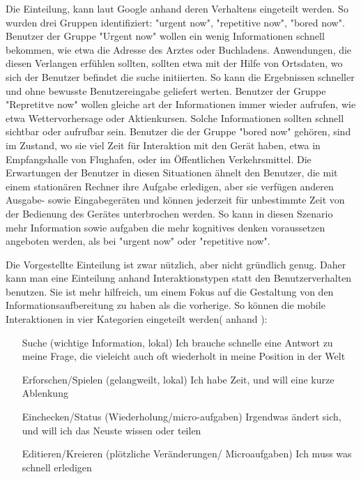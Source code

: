 Die Einteilung, kann laut Google anhand deren Verhaltens eingeteilt werden. So wurden drei Gruppen identifiziert: "urgent now", "repetitive now", "bored now"\cite{googleUsers}. Benutzer der Gruppe "Urgent now" wollen ein wenig Informationen schnell bekommen, wie etwa die Adresse des Arztes oder Buchladens. Anwendungen, die diesen Verlangen erfühlen sollten, sollten etwa mit der Hilfe von Ortsdaten, wo sich der Benutzer befindet die suche initiierten. So kann die Ergebnissen schneller und ohne bewusste Benutzereingabe geliefert werten. Benutzer der Gruppe "Repretitve now" wollen gleiche art der Informationen immer wieder aufrufen, wie etwa Wettervorhersage oder Aktienkursen. Solche Informationen sollten schnell sichtbar oder aufrufbar sein. Benutzer die der Gruppe "bored now" gehören, sind im Zustand, wo sie viel Zeit für Interaktion mit den Gerät haben, etwa in Empfangshalle von Flughafen, oder im Öffentlichen Verkehrsmittel. Die Erwartungen der Benutzer in diesen Situationen ähnelt den Benutzer, die mit einem stationären Rechner ihre Aufgabe erledigen, aber sie verfügen anderen Ausgabe- sowie Eingabegeräten und können jederzeit für unbestimmte Zeit von der Bedienung des Gerätes unterbrochen werden. So kann in diesen Szenario mehr Information sowie aufgaben die mehr kognitives denken voraussetzen angeboten werden, als bei "urgent now" oder "repetitive now".

Die Vorgestellte Einteilung ist zwar nützlich, aber nicht gründlich genug. Daher kann man eine Einteilung anhand Interaktionstypen statt den Benutzerverhalten benutzen. Sie ist mehr hilfreich, um einem Fokus auf die Gestaltung von den Informationsaufbereitung zu haben als die vorherige. So können die mobile Interaktionen in vier Kategorien eingeteilt werden( anhand \cite[Seite 50]{mobileFirst}):

\begin{itemize}
 	\item[Suche (wichtige Information, lokal)] Ich brauche schnelle eine Antwort zu meine Frage, die vieleicht auch oft wiederholt in meine Position in der Welt
 	\item[Erforschen/Spielen (gelangweilt, lokal)] Ich habe Zeit, und will eine kurze Ablenkung
 	\item[Einchecken/Status (Wiederholung/micro-aufgaben)] Irgendwas ändert sich, und will ich das Neuste wissen oder teilen
 	\item[Editieren/Kreieren (plötzliche Veränderungen/ Microaufgaben)] Ich muss was schnell erledigen
 \end{itemize} 

